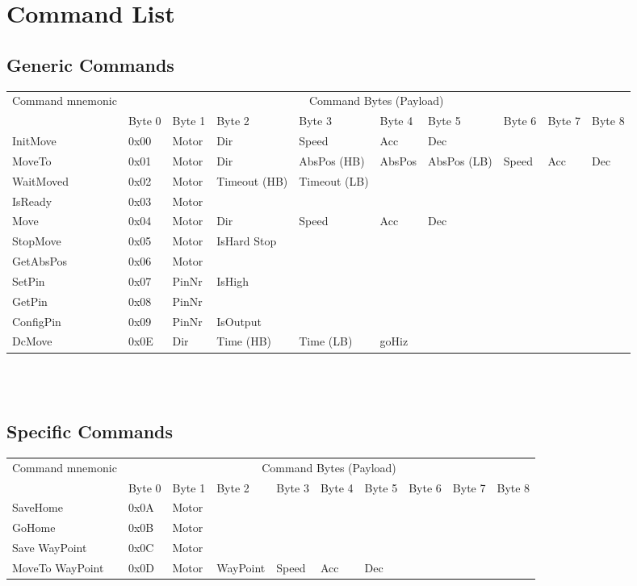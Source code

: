 \documentclass[10pt,a4paper]{article}
\newcommand{\IMV}{0x00}
\newcommand{\MTO}{0x01}
\newcommand{\WTM}{0x02}
\newcommand{\IRD}{0x03}
\newcommand{\MOV}{0x04}
\newcommand{\SPM}{0x05}
\newcommand{\GAP}{0x06}
\newcommand{\STP}{0x07}
\newcommand{\GTP}{0x08}
\newcommand{\CNP}{0x09}
\newcommand{\DCM}{0x0E}
\newcommand{\SVH}{0x0A}
\newcommand{\GOH}{0x0B}
\newcommand{\SWP}{0x0C}
\newcommand{\MWP}{0x0D}
\begin{document}
\section{Command List}
\subsection{Generic Commands}
\begin{tabular}{|p{1.8cm}|p{1cm}|p{1cm}|p{1.3cm}|p{1.2cm}|p{1cm}|p{1cm}|p{1cm}|p{1cm}|p{1cm}|}
	\hline
	\multirow{2}{2cm}{Command mnemonic} & \multicolumn{9}{c|}{Command Bytes (Payload)} \\\cline{2-10} 
		&  Byte 0 & Byte 1 & Byte 2 & Byte 3 & Byte 4 & Byte 5 & Byte 6 & Byte 7 & Byte 8\\ \hline
	InitMove	& \IMV	& Motor	& Dir & Speed & Acc & Dec & & & \\\hline
	MoveTo		& \MTO	& Motor	& Dir & AbsPos (HB) & AbsPos & AbsPos (LB) & Speed & Acc & Dec \\\hline
	WaitMoved	& \WTM	& Motor	& Timeout (HB) & Timeout (LB)& & & & & \\\hline
	IsReady	& \IRD	& Motor	& & & & & & & \\\hline
	Move	& \MOV	& Motor	& Dir & Speed & Acc & Dec & & & \\\hline
	StopMove & \SPM& Motor	& IsHard Stop & & & & & & \\\hline
	GetAbsPos& \GAP& Motor	& & & & & & & \\\hline
	SetPin	& \STP	& PinNr	& IsHigh & & & & & & \\\hline
	GetPin	& \GTP	& PinNr	& & & & & & & \\\hline
	ConfigPin& \CNP& PinNr	& IsOutput & & & & & & \\\hline	
	DcMove	& \DCM & Dir & Time (HB) & Time (LB) & goHiz & & & & \\\hline
\end{tabular}
\\\\

\subsection{Specific Commands}
\begin{tabular}{|p{1.8cm}|p{1cm}|p{1cm}|p{1.4cm}|p{1cm}|p{1cm}|p{1cm}|p{1cm}|p{1cm}|p{1cm}|}
	\hline
	\multirow{2}{2cm}{Command mnemonic} & \multicolumn{9}{c|}{Command Bytes (Payload)} \\\cline{2-10} 
		&  Byte 0 & Byte 1 & Byte 2 & Byte 3 & Byte 4 & Byte 5 & Byte 6 & Byte 7 & Byte 8 \\ \hline
	SaveHome	& \SVH	& Motor	& & & & & & & \\\hline
	GoHome		& \GOH	& Motor	& & & & & & & \\\hline
	Save \mbox{WayPoint}& \SWP	& Motor	& & & & & & & \\\hline
	MoveTo WayPoint& \MWP& Motor	& WayPoint & Speed & Acc & Dec & & & \\\hline
\end{tabular}
\end{document}
